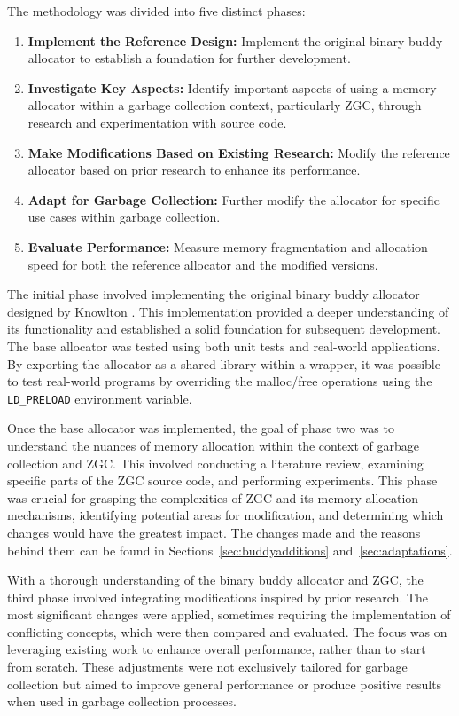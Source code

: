 The methodology was divided into five distinct phases:

\begin{enumerate}
    \item \textbf{Implement the Reference Design:} Implement the original binary buddy allocator to establish a foundation for further development.
    \item \textbf{Investigate Key Aspects:} Identify important aspects of using a memory allocator within a garbage collection context, particularly ZGC, through research and experimentation with source code.
    \item \textbf{Make Modifications Based on Existing Research:} Modify the reference allocator based on prior research to enhance its performance.
    \item \textbf{Adapt for Garbage Collection:} Further modify the allocator for specific use cases within garbage collection.
    \item \textbf{Evaluate Performance:} Measure memory fragmentation and allocation speed for both the reference allocator and the modified versions.
\end{enumerate}

The initial phase involved implementing the original binary buddy allocator designed by Knowlton \cite{buddy}. This implementation provided a deeper understanding of its functionality and established a solid foundation for subsequent development. The base allocator was tested using both unit tests and real-world applications. By exporting the allocator as a shared library within a wrapper, it was possible to test real-world programs by overriding the malloc/free operations using the \texttt{LD\_PRELOAD} environment variable.

Once the base allocator was implemented, the goal of phase two was to understand the nuances of memory allocation within the context of garbage collection and ZGC. This involved conducting a literature review, examining specific parts of the ZGC source code, and performing experiments. This phase was crucial for grasping the complexities of ZGC and its memory allocation mechanisms, identifying potential areas for modification, and determining which changes would have the greatest impact. The changes made and the reasons behind them can be found in Sections~\ref{sec:buddyadditions} and~\ref{sec:adaptations}.

With a thorough understanding of the binary buddy allocator and ZGC, the third phase involved integrating modifications inspired by prior research. The most significant changes were applied, sometimes requiring the implementation of conflicting concepts, which were then compared and evaluated. The focus was on leveraging existing work to enhance overall performance, rather than to start from scratch. These adjustments were not exclusively tailored for garbage collection but aimed to improve general performance or produce positive results when used in garbage collection processes.

